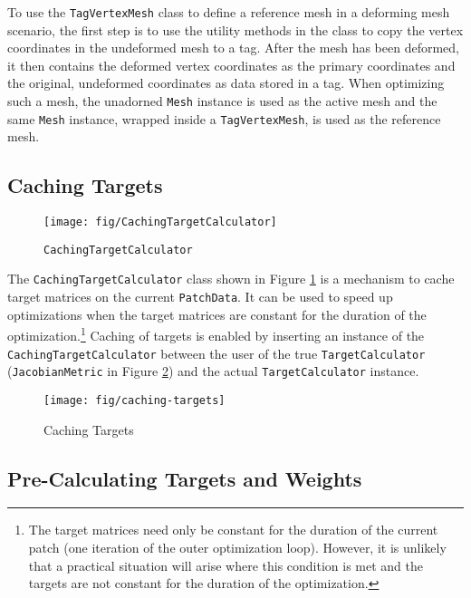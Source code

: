 \documentclass{article}
\begin{document}
To use the \texttt{TagVertexMesh} class to define a reference mesh in a deforming mesh scenario, the first step is to use the utility methods in the class to copy the vertex coordinates in the undeformed mesh to a tag.  After the mesh has been deformed, it then contains the deformed vertex coordinates as the primary coordinates and the original, undeformed coordinates as data stored in a tag.  When optimizing such a mesh, the unadorned \texttt{Mesh} instance is used as the active mesh and the same \texttt{Mesh} instance, wrapped inside a \texttt{TagVertexMesh}, is used as the reference mesh.

\subsection{Caching Targets}

\begin{figure}[htb]
\begin{center}
\texttt{[image: fig/CachingTargetCalculator]}
\caption{\texttt{CachingTargetCalculator}\label{fig:cachetarget}}
\end{center}
\end{figure}

The \texttt{CachingTargetCalculator} class shown in Figure \ref{fig:cachetarget} is a mechanism to cache target matrices on the current \texttt{PatchData}.  It can be used to speed up optimizations when the target matrices are constant for the duration of the optimization.\footnote{The target matrices need only be constant for the duration of the current patch (one iteration of the outer optimization loop).  However, it is unlikely that a practical situation will arise where this condition is met and the targets are not constant for the duration of the optimization.}  Caching of targets is enabled by inserting an instance of the \texttt{CachingTargetCalculator} between the user of the true \texttt{TargetCalculator} (\texttt{JacobianMetric} in Figure \ref{fig:usecachetarget}) and the actual \texttt{TargetCalculator} instance.

\begin{figure}[htb]
\begin{center}
\texttt{[image: fig/caching-targets]}
\caption{Caching Targets\label{fig:usecachetarget}}
\end{center}
\end{figure}


\subsection{Pre-Calculating Targets and Weights}
\end{document}
